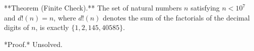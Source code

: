 
**Theorem (Finite Check).** The set of natural numbers $n$ satisfying $n < 10^7$ and $d!(n) = n$, where $d!(n)$ denotes the sum of the factorials of the decimal digits of $n$, is exactly $\{1, 2, 145, 40585\}$.

*Proof.* Unsolved.